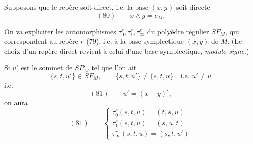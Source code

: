 \documentclass[11pt,a4paper]{article}
\begin{document}
 Supposons que le repère soit direct, i.e. la base $(x,y)$ soit directe
\[
(80)\qquad x \wedge y = e_M .
\]

On va expliciter les automorphismes $\tau_0^r, \tau_1^r, \tau_\infty^r$ du polyèdre régulier  $SF_M$, qui correspondent au repère  $r$ (79), i.e. à la base symplectique $(x,y)$ de $M$. (Le choix  d'un repère direct revient à celui d'une base symplectique, \emph{modulo signe}.)


Si $u'$ est le sommet de $SP_M$ tel que l'on ait
\[
\{s,t,u'\} \in SF_M, \qquad \{s,t,u'\} \neq \{s,t,u\} \quad \text{i.e. } u' \neq u
\]
i.e.
\[
(81)\qquad u' = (x - y)^{\cdot} ,
\]
on aura
\[
(81)\qquad
\begin{cases}
\tau_0^r(s,t,u) = (t,s,u) \\
\tau_1^r(s,t,u) = (s,u,t) \\
\tau_\infty^r(s,t,u) = (s,t,u')
\end{cases}
\]
\end{document}
